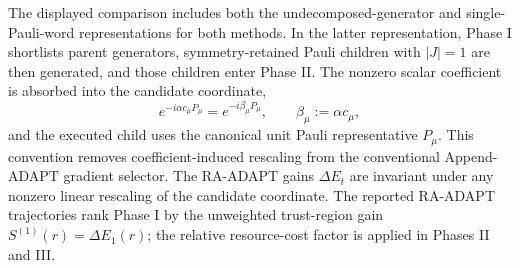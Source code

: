 \documentclass[
  reprint,
  amsmath,
  amssymb,
  aps,
  pra,
  nofootinbib,
  superscriptaddress,
  floatfix
]{revtex4-2}
\begin{document}
The displayed comparison includes both the undecomposed-generator and
single-Pauli-word representations for both methods. In the latter representation,
Phase I shortlists parent generators, symmetry-retained Pauli children with
\(|J|=1\) are then generated, and those children enter Phase II.
The nonzero scalar coefficient is absorbed into the candidate coordinate,
\begin{equation*}
e^{-i\alpha c_\mu P_\mu}
=e^{-i\beta_\mu P_\mu},
\qquad
\beta_\mu:=\alpha c_\mu,
\end{equation*}
and the executed child uses the canonical unit Pauli representative \(P_\mu\).
This convention removes coefficient-induced rescaling from the conventional
Append-ADAPT gradient selector. The RA-ADAPT gains \(\Delta E_t\) are
invariant under any nonzero linear rescaling of the candidate coordinate.
The reported RA-ADAPT trajectories rank Phase I by the unweighted trust-region
gain \(S^{(1)}(r)=\Delta E_1(r)\); the relative resource-cost factor is applied
in Phases II and III.

\end{document}
